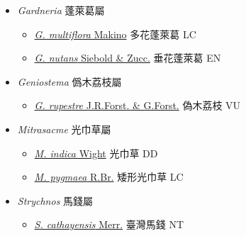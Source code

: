 
  \begin{itemize}
 \item[] \textit{Gardneria} 蓬萊葛屬
                                
  \begin{itemize}
        \item[] \href{http://www.theplantlist.org/tpl1.1/search?q=Gardneria+multiflora}{\textit{G. multiflora} Makino}   多花蓬萊葛   LC
        \item[] \href{http://www.theplantlist.org/tpl1.1/search?q=Gardneria+nutans}{\textit{G. nutans} Siebold \& Zucc.}   垂花蓬萊葛   EN
  \end{itemize}
 \item[] \textit{Geniostema} 僞木荔枝屬
                                
  \begin{itemize}
        \item[] \href{http://www.theplantlist.org/tpl1.1/search?q=Geniostema+rupestre}{\textit{G. rupestre} J.R.Forst. \& G.Forst.}   偽木荔枝   VU
  \end{itemize}
 \item[] \textit{Mitrasacme} 光巾草屬
                                
  \begin{itemize}
        \item[] \href{http://www.theplantlist.org/tpl1.1/search?q=Mitrasacme+indica}{\textit{M. indica} Wight}   光巾草   DD
        \item[] \href{http://www.theplantlist.org/tpl1.1/search?q=Mitrasacme+pygmaea}{\textit{M. pygmaea} R.Br.}   矮形光巾草   LC
  \end{itemize}
 \item[] \textit{Strychnos} 馬錢屬
                                
  \begin{itemize}
        \item[] \href{http://www.theplantlist.org/tpl1.1/search?q=Strychnos+cathayensis}{\textit{S. cathayensis} Merr.}   臺灣馬錢   NT
  \end{itemize}
  \end{itemize}
